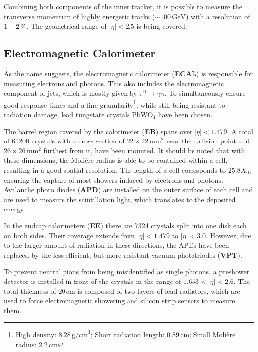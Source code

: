 Combining both components of the inner tracker, it is possible to measure the transverse momentum of highly energetic tracks ($\sim 100\,\text{GeV}$) with a resolution of $1-2\,\pct$. The geometrical range of $|\eta| < 2.5$ is being covered.


\subsection{Electromagnetic Calorimeter}

As the name suggests, the electromagnetic calorimeter (\textbf{ECAL}) is responsible for measuring electrons and photons. This also includes the electromagnetic component of jets, which is mostly given by $\pi^0 \rightarrow \gamma \gamma$. To simultaneously ensure good response times and a fine granularity\footnote{High density: $8.28\,\text{g/cm}^3$; Short radiation length: $0.89\,\text{cm}$; Small Moli\`{e}re radius: $2.2\,\text{cm}$}, while still being resistant to radiation damage, lead tungstate crystals PbWO$_4$ have been chosen.

The barrel region covered by the calorimeter (\textbf{EB}) spans over $|\eta| < 1.479$. A total of 61200 crystals with a cross section of $22 \times 22\,\text{mm}^2$ near the collision point and $26 \times 26\,\text{mm}^2$ furthest from it, have been mounted. It should be noted that with these dimensions, the Moli\`{e}re radius is able to be contained within a cell, resulting in a good spatial resolution. The length of a cell corresponds to $25.8 X_0$, ensuring the capture of most showers induced by electrons and photons. Avalanche photo diodes (\textbf{APD}) are installed on the outer surface of each cell and are used to measure the scintillation light, which translates to the deposited energy.

In the endcap calorimeters (\textbf{EE}) there are 7324 crystals split into one disk each on both sides. Their coverage extends from $|\eta| < 1.479$ to $|\eta| < 3.0$. However, due to the larger amount of radiation in these directions, the APDs have been replaced by the less efficient, but more resistant vacuum phototriodes (\textbf{VPT}).

To prevent neutral pions from being misidentified as single photons, a preshower detector is installed in front of the crystals in the range of $1.653 < |\eta| < 2.6$. The total thickness of $20\,\text{cm}$ is composed of two layers of lead radiators, which are used to force electromagnetic showering and silicon strip sensors to measure them.

